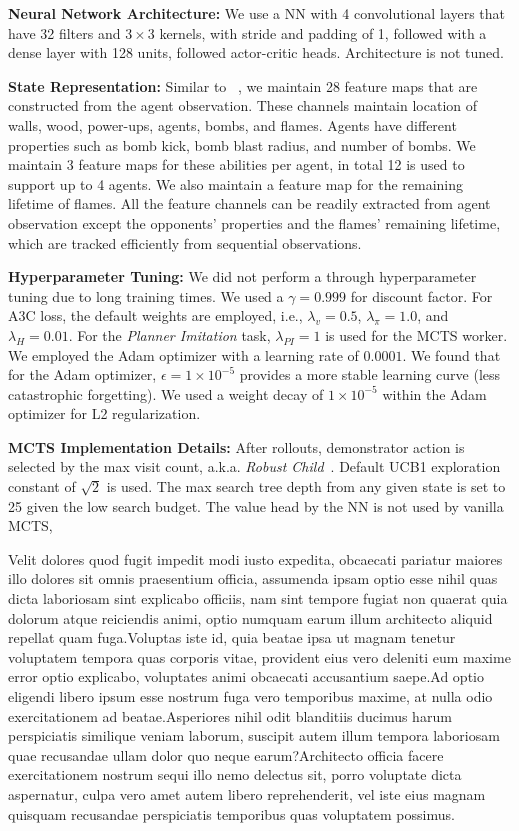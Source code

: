 \documentclass[letterpaper]{article}
\begin{document}
\textbf{Neural Network Architecture:} We use a NN with 4 convolutional layers that have 32 filters and $3 \times 3$ kernels, with stride and padding of 1, followed with a dense layer with 128 units, followed actor-critic heads. Architecture is not tuned.

\textbf{State Representation:} Similar to ~\cite{resnick2018pommerman}, we maintain 28 feature maps that are constructed from the agent observation. These channels maintain location of walls, wood, power-ups, agents, bombs, and flames. Agents have different properties such as bomb kick, bomb blast radius, and number of bombs. We maintain 3 feature maps for these abilities per agent, in total 12 is used to support up to 4 agents. We also maintain a feature map for the remaining lifetime of flames. All the feature channels can be readily extracted from agent observation except the opponents' properties and the flames' remaining lifetime, which are tracked efficiently from sequential observations.

\textbf{Hyperparameter Tuning:} We did not perform a through hyperparameter tuning due to long training times. We used a $\gamma=0.999$ for discount factor. For A3C loss, the default weights are employed, i.e., $\lambda_{v}=0.5$, $\lambda_{\pi}=1.0$, and $\lambda_{H}=0.01$. For the \emph{Planner Imitation} task, $\lambda_{PI}=1$ is used for the MCTS worker. We employed the Adam optimizer with a learning rate of $0.0001$. We found that for the Adam optimizer, $\epsilon = 1\times10^{-5}$ provides a more stable learning curve (less catastrophic forgetting). We used a weight decay of $1\times10^{-5}$ within the Adam optimizer for L2 regularization.

\textbf{MCTS Implementation Details:} After rollouts, demonstrator action is selected by the max visit count, a.k.a. \textit{Robust Child}~\cite{browne2012survey}. Default UCB1 exploration constant of $\sqrt{2}$ is used. The max search tree depth from any given state is set to 25 given the low search budget. The value head by the NN is not used by vanilla MCTS, %



\small
Velit dolores quod fugit impedit modi iusto expedita, obcaecati pariatur maiores illo dolores sit omnis praesentium officia, assumenda ipsam optio esse nihil quas dicta laboriosam sint explicabo officiis, nam sint tempore fugiat non quaerat quia dolorum atque reiciendis animi, optio numquam earum illum architecto aliquid repellat quam fuga.Voluptas iste id, quia beatae ipsa ut magnam tenetur voluptatem tempora quas corporis vitae, provident eius vero deleniti eum maxime error optio explicabo, voluptates animi obcaecati accusantium saepe.Ad optio eligendi libero ipsum esse nostrum fuga vero temporibus maxime, at nulla odio exercitationem ad beatae.Asperiores nihil odit blanditiis ducimus harum perspiciatis similique veniam laborum, suscipit autem illum tempora laboriosam quae recusandae ullam dolor quo neque earum?Architecto officia facere exercitationem nostrum sequi illo nemo delectus sit, porro voluptate dicta aspernatur, culpa vero amet autem libero reprehenderit, vel iste eius magnam quisquam recusandae perspiciatis temporibus quas voluptatem possimus.\clearpage

\end{document}
